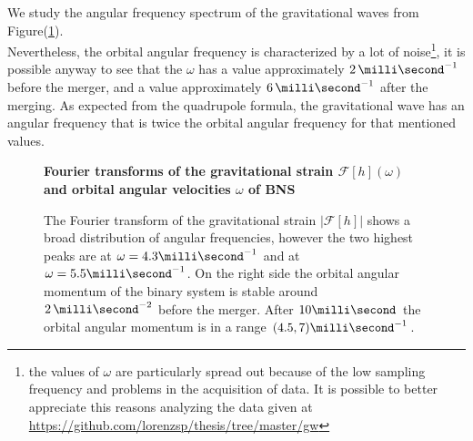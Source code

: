 \pagebreak
We study the angular frequency spectrum of the gravitational waves from Figure(\ref{fourier_omega_bns}).\\
Nevertheless, the orbital angular frequency is characterized by a lot of noise\footnote{the values of $\omega$ are particularly spread out because of the low sampling frequency and problems in the acquisition of data. It is possible to better appreciate this reasons analyzing the data given at \url{https://github.com/lorenzsp/thesis/tree/master/gw}}, it is possible anyway to see that the $\omega$ has a value approximately $2 \, \milli \second ^{-1}$ before the merger, and a value approximately $6 \, \milli \second ^{-1}$ after the merging.
As expected from the quadrupole formula, the gravitational wave has an angular frequency that is twice the orbital angular frequency for that mentioned values.

\begin{figure}[]
\centering
    \textbf{Fourier transforms of the gravitational strain  $\mathcal{F}[h](\omega)$ and orbital angular velocities $\omega$ of BNS}\par\medskip
\centering

 \quad
{} 

   
   \caption{The Fourier transform of the gravitational strain $|\mathcal{F}[h]|$ shows a broad distribution of angular frequencies, however the two highest peaks are at $\omega= 4.3 \milli \second^{-1}$ and at $\omega= 5.5 \milli \second^{-1}$. On the right side the orbital angular momentum of the binary system is stable around $2 \, \milli \second ^{-2}$ before the merger. After $10 \milli \second$ the orbital angular momentum is in a range $(4.5,7) \milli \second ^{-1} $. }
\label{fourier_omega_bns}
\end{figure}



 

